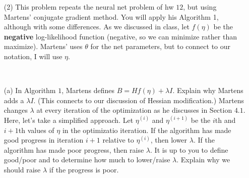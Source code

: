\documentclass[]{article}
\begin{document}
\begin{itemize} \item[(2)] This problem repeats the neural net problem of hw $12$, but using Martens' conjugate gradient method. You will apply his Algorithm 1, although with some differences.  As we discussed in class, let $f(\eta)$ be the \textbf{negative} log-likelihood function (negative, so we can minimize rather than maximize).  Martens' uses $\theta$ for the net parameters, but to connect to our notation, I will use $\eta$.
\end{itemize}

~

\begin{itemize} \item[(a)] 
In Algorithm $1$, Martens defines $B = Hf(\eta) + \lambda I$.  Explain why Martens adds a $\lambda I$.  (This connects to our discussion of Hessian modification.)   Martens changes $\lambda$ at every iteration of the optimization as he discusses in Section $4.1$.   Here, let's take a simplified approach.  Let $\eta^{(i)}$ and $\eta^{(i+1)}$ be the $i$th and $i+1$th values of $\eta$ in the optimizatio iteration.  If the algorithm has made good progress in iteration $i+1$ relative to $\eta^{(i)}$, then lower $\lambda$.  If the algorithm has made poor progress, then raise $\lambda$.  It is up to you to define good/poor and to determine how much to lower/raise $\lambda$.   Explain why we should raise $\lambda$ if the progress is poor.
\end{itemize}

~
\end{document}
